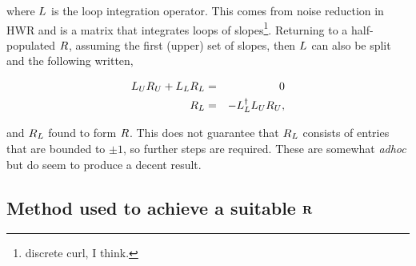 \documentclass[a4paper]{article}
\begin{document}
where $\mathnormal{L}$ is the loop integration operator. This comes from noise
reduction in HWR and is a matrix that integrates loops of
slopes\footnote{discrete curl, I think.}. Returning to a half-populated
$\mathnormal{R}$, assuming the first (upper) set of slopes, then $\mathnormal{L}$
can also be split and the following written,

\begin{eqnarray}
   \mathnormal{L}_U\mathnormal{R}_U+\mathnormal{L}_L\mathnormal{R}_L&=&0
      \nonumber \\
   \mathnormal{R}_L&=&-\mathnormal{L}_L^{\dagger}\mathnormal{L}_U\mathnormal{R}_U,
\end{eqnarray}

and $\mathnormal{R}_L$ found to form $\mathnormal{R}$. This does not guarantee
that $\mathnormal{R}_L$ consists of entries that are bounded to $\pm1$, so
further steps are required. These are somewhat {\it adhoc} but do seem to
produce a decent result.

\subsection{Method used to achieve a suitable $\bf{R}$}
\end{document}
